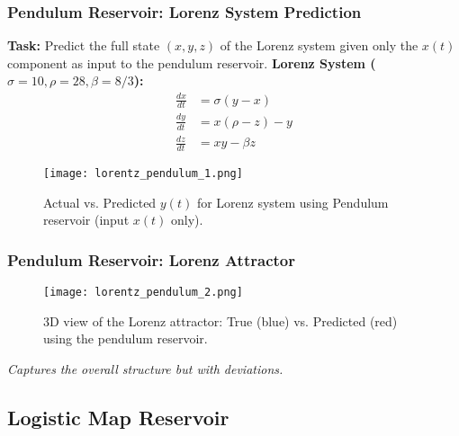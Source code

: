 \documentclass{beamer}
\begin{document}
\begin{frame}
    \frametitle{Pendulum Reservoir: Lorenz System Prediction}
    \textbf{Task:} Predict the full state $(x, y, z)$ of the Lorenz system given only the $x(t)$ component as input to the pendulum reservoir.
    \vspace{1em}
    \textbf{Lorenz System ($\sigma=10, \rho=28, \beta=8/3$):}
    \begin{equation*} %
    \begin{aligned}
    \frac{dx}{dt} &= \sigma (y - x) \\
    \frac{dy}{dt} &= x (\rho - z) - y \\
    \frac{dz}{dt} &= x y - \beta z
    \end{aligned}
    \end{equation*}
    \pause
     \begin{figure}
        \centering
        \texttt{[image: lorentz\_pendulum\_1.png]}
        \caption{Actual vs. Predicted $y(t)$ for Lorenz system using Pendulum reservoir (input $x(t)$ only).}
        \label{fig:lorentz_1_slide}
    \end{figure}
\end{frame}

\begin{frame}
    \frametitle{Pendulum Reservoir: Lorenz Attractor}
     \begin{figure}
        \centering
        \texttt{[image: lorentz\_pendulum\_2.png]}
        \caption{3D view of the Lorenz attractor: True (blue) vs. Predicted (red) using the pendulum reservoir.}
        \label{fig:lorentz_2_slide}
    \end{figure}
    \textit{Captures the overall structure but with deviations.}
\end{frame}

\subsection{Logistic Map Reservoir}
\end{document}

